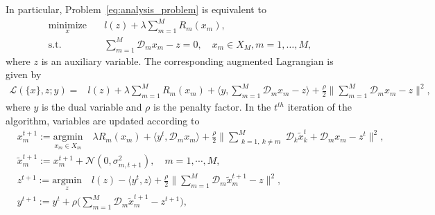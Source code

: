 In particular, Problem~\eqref{eq:analysis_problem} is equivalent to
\begin{align}
\underset{x}{\text{minimize}} &\quad l\left(z\right) + \lambda\sum_{m=1}^{M} R_m(x_m),\\
\text{s.t.} &\quad \sum_{m=1}^{M} \mathcal{D}_m x_m - z = 0,\quad x_m\in X_M, m=1,\ldots,M,
\end{align}
where $z$ is an auxiliary variable. 
The corresponding augmented Lagrangian is given by
\begin{align}
\mathcal{L}(\{x\}, z; y) =& l(z) + \lambda\sum_{m=1}^{M} R_m(x_m) + \langle y, \sum_{m=1}^{M}\mathcal{D}_m x_m - z\rangle + \frac{\rho}{2}\|\sum_{m=1}^{M} \mathcal{D}_m x_m - z\|^2, \label{eq:lagragian}
\end{align}
where $y$ is the dual variable and $\rho$ is the penalty factor. In the $t^{th}$ iteration of the algorithm, variables are updated according to
\begin{align}
  &x_{m}^{t+1}:=\underset{x_m\in X_m}{\text{argmin}}\quad\lambda R_m(x_m) + \langle y^t, \mathcal{D}_mx_m\rangle + \frac{\rho}{2}\big\|\sum_{\substack{k=1,~k\neq m}}^{M}\mathcal{D}_k\tilde{x}_k^{t} + \mathcal{D}_mx_m - z^t\big\|^2,
  \label{eq:pal_algo_x}\\
  &\tilde{x}_m^{t+1}:= x_m^{t+1}+\mathcal{N}(0,\sigma_{m,t+1}^2),\quad m=1,\cdots,M,\label{eq:add_noise}\\
  &z^{t+1}:=\underset{z}{\text{argmin}}\quad l(z)  - \langle y^t, z \rangle + \frac{\rho}{2} \big\|\sum_{m=1}^{M}\mathcal{D}_m\tilde{x}_m^{t+1} - z\big\|^2,\label{eq:pal_algo_z}\\
&y^{t+1}:=y^t + \rho\big(\sum_{m=1}^{M}\mathcal{D}_m\tilde{x}_m^{t+1} - z^{t+1}\big),\label{eq:pal_algo_y}
\end{align}

